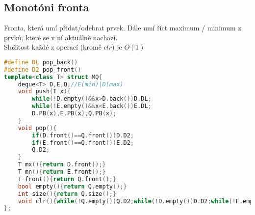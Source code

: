 \documentclass[11pt]{article}
\begin{document}
\subsection{Monotóni fronta}
Fronta, která umí přidat/odebrat prvek. Dále umí říct maximum / minimum z prvků, které se v ní aktuálně nachazí.
\\Složitost každé z operací (kromě $clr$) je $O(1)$
\begin{lstlisting}[language=C++]
#define DL pop_back()
#define D2 pop_front()
template<class T> struct MQ{
    deque<T> D,E,Q;//E(min)|D(max)
    void push(T x){
        while(!D.empty()&&x>D.back())D.DL;
        while(!E.empty()&&x<E.back())E.DL;
        D.PB(x),E.PB(x),Q.PB(x);
    }
    void pop(){
        if(D.front()==Q.front())D.D2;
        if(E.front()==Q.front())E.D2;
        Q.D2;
    }
    T mx(){return D.front();}
    T mn(){return E.front();}
    T front(){return Q.front();}
    bool empty(){return Q.empty();}
    int size(){return Q.size();}
    void clr(){while(!Q.empty())Q.D2;while(!D.empty())D.D2;while(!E.empty())E.D2;}
};
\end{lstlisting}
\end{document}
